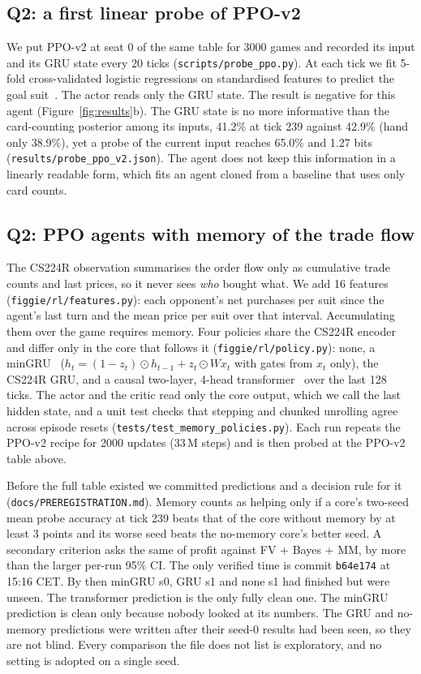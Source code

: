 \documentclass{article}
\newcommand{\file}[1]{{\small\texttt{#1}}}
\begin{document}
\subsection{Q2: a first linear probe of PPO-v2}
We put PPO-v2 at seat 0 of the same table for 3000 games and recorded its input and its GRU state every 20 ticks (\file{scripts/probe\_ppo.py}). At each tick we fit 5-fold cross-validated logistic regressions on standardised features to predict the goal suit~\cite{probes}. The actor reads only the GRU state.
The result is negative for this agent (Figure~\ref{fig:results}b). The GRU state is no more informative than the card-counting posterior among its inputs, 41.2\% at tick 239 against 42.9\% (hand only 38.9\%), yet a probe of the current input reaches 65.0\% and 1.27 bits (\file{results/probe\_ppo\_v2.json}).
The agent does not keep this information in a linearly readable form, which fits an agent cloned from a baseline that uses only card counts.

\subsection{Q2: PPO agents with memory of the trade flow}
\label{sec:memory}
The CS224R observation summarises the order flow only as cumulative trade counts and last prices, so it never sees \emph{who} bought what.
We add 16 features (\file{figgie/rl/features.py}): each opponent's net purchases per suit since the agent's last turn and the mean price per suit over that interval.
Accumulating them over the game requires memory.
Four policies share the CS224R encoder and differ only in the core that follows it (\file{figgie/rl/policy.py}): none, a minGRU~\cite{mingru} ($h_t=(1-z_t)\odot h_{t-1}+z_t\odot W x_t$ with gates from $x_t$ only), the CS224R GRU, and a causal two-layer, 4-head transformer~\cite{transformer} over the last 128 ticks.
The actor and the critic read only the core output, which we call the last hidden state, and a unit test checks that stepping and chunked unrolling agree across episode resets (\file{tests/test\_memory\_policies.py}).
Each run repeats the PPO-v2 recipe for 2000 updates (33\,M steps) and is then probed at the PPO-v2 table above.

Before the full table existed we committed predictions and a decision rule for it (\file{docs/PREREGISTRATION.md}).
Memory counts as helping only if a core's two-seed mean probe accuracy at tick 239 beats that of the core without memory by at least 3 points and its worse seed beats the no-memory core's better seed. A secondary criterion asks the same of profit against FV + Bayes + MM, by more than the larger per-run 95\% CI.
The only verified time is commit \texttt{b64e174} at 15:16 CET. By then minGRU s0, GRU s1 and none s1 had finished but were unseen. The transformer prediction is the only fully clean one. The minGRU prediction is clean only because nobody looked at its numbers. The GRU and no-memory predictions were written after their seed-0 results had been seen, so they are not blind.
Every comparison the file does not list is exploratory, and no setting is adopted on a single seed.
\end{document}
